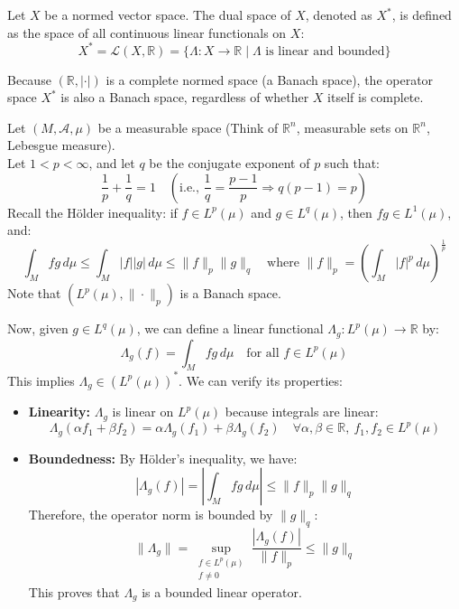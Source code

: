 
\begin{definition}
    Let $X$ be a normed vector space. The dual space of $X$, denoted as $X^*$, is defined as the space of all continuous linear functionals on $X$:
    \[ X^* = \mathcal{L}(X, \mathbb{R}) = \{ \Lambda : X \to \mathbb{R} \mid \Lambda \text{ is linear and bounded} \} \]
\end{definition}

\begin{remark}
    Because $(\mathbb{R}, |\cdot|)$ is a complete normed space (a Banach space), the operator space $X^*$ is also a Banach space, regardless of whether $X$ itself is complete.
\end{remark}

\begin{example}
    Let $(M, \mathcal{A}, \mu)$ be a measurable space (Think of $\mathbb{R}^n$, measurable sets on $\mathbb{R}^n$, Lebesgue measure). \\
    Let $1 < p < \infty$, and let $q$ be the conjugate exponent of $p$ such that:
    \[ \frac{1}{p} + \frac{1}{q} = 1 \quad \left(\text{i.e., } \frac{1}{q} = \frac{p-1}{p} \Rightarrow q(p-1) = p \right) \]
    Recall the Hölder inequality: if $f \in L^p(\mu)$ and $g \in L^q(\mu)$, then $fg \in L^1(\mu)$, and:
    \[ \int_M fg \, d\mu \le \int_M |f||g| \, d\mu \le \|f\|_p \|g\|_q \quad \text{where } \|f\|_p = \left( \int_M |f|^p \, d\mu \right)^{\frac{1}{p}} \]
    Note that $(L^p(\mu), \|\cdot\|_p)$ is a Banach space.

    Now, given $g \in L^q(\mu)$, we can define a linear functional $\Lambda_g : L^p(\mu) \to \mathbb{R}$ by:
    \[ \Lambda_g(f) = \int_M fg \, d\mu \quad \text{for all } f \in L^p(\mu) \]
    This implies $\Lambda_g \in (L^p(\mu))^*$. We can verify its properties:
    \begin{itemize}
        \item \textbf{Linearity:} $\Lambda_g$ is linear on $L^p(\mu)$ because integrals are linear: 
        \[ \Lambda_g(\alpha f_1 + \beta f_2) = \alpha \Lambda_g(f_1) + \beta \Lambda_g(f_2) \quad \forall \alpha, \beta \in \mathbb{R}, \ f_1, f_2 \in L^p(\mu) \]
        \item \textbf{Boundedness:} By Hölder's inequality, we have:
        \[ |\Lambda_g(f)| = \left| \int_M fg \, d\mu \right| \le \|f\|_p \|g\|_q \]
        Therefore, the operator norm is bounded by $\|g\|_q$:
        \[ \|\Lambda_g\| = \sup_{\substack{f \in L^p(\mu) \\ f \neq 0}} \frac{|\Lambda_g(f)|}{\|f\|_p} \le \|g\|_q \]
        This proves that $\Lambda_g$ is a bounded linear operator.
    \end{itemize}
\end{example}



